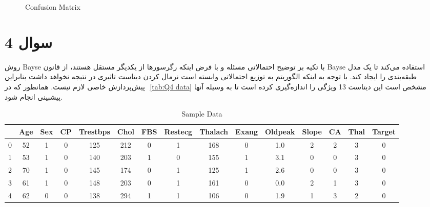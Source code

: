 \documentclass{article}
\begin{document}
\begin{figure}[H] 
	\centering
	\caption{Confusion Matrix}
	\label{fig: Q3 rf cm}
\end{figure}


\section{سوال 4}

روش Bayse با تکیه بر توضیح احتمالاتی مسئله و با فرض اینکه رگرسورها از یکدیگر مستقل هستند، از قانون
Bayse 
استفاده می‌کند تا یک مدل طبقه‌بندی را ایجاد کند. با توجه به اینکه الگوریتم به توزیع احتمالاتی وابسته است نرمال کردن دیتاست تاثیری در نتیجه نخواهد داشت بنابراین پیش‌پردازش خاصی لازم نیست. همانطور که در ‎
\autoref{tab:Q4 data}
مشخص است این دیتاست 13 ویژگی را اندازه‌گیری کرده است تا به وسیله آنها پیشبینی انجام شود.

\begin{table}[ht]
\centering
\begin{tabular}{ccccccccccccccc}
\toprule
 & Age & Sex & CP & Trestbps & Chol & FBS & Restecg & Thalach & Exang & Oldpeak & Slope & CA & Thal & Target \\
\midrule
0 & 52 & 1 & 0 & 125 & 212 & 0 & 1 & 168 & 0 & 1.0 & 2 & 2 & 3 & 0 \\
1 & 53 & 1 & 0 & 140 & 203 & 1 & 0 & 155 & 1 & 3.1 & 0 & 0 & 3 & 0 \\
2 & 70 & 1 & 0 & 145 & 174 & 0 & 1 & 125 & 1 & 2.6 & 0 & 0 & 3 & 0 \\
3 & 61 & 1 & 0 & 148 & 203 & 0 & 1 & 161 & 0 & 0.0 & 2 & 1 & 3 & 0 \\
4 & 62 & 0 & 0 & 138 & 294 & 1 & 1 & 106 & 0 & 1.9 & 1 & 3 & 2 & 0 \\
\bottomrule
\end{tabular}
\caption{Sample Data}
\label{tab:sample_data}
\end{table}
\end{document}
